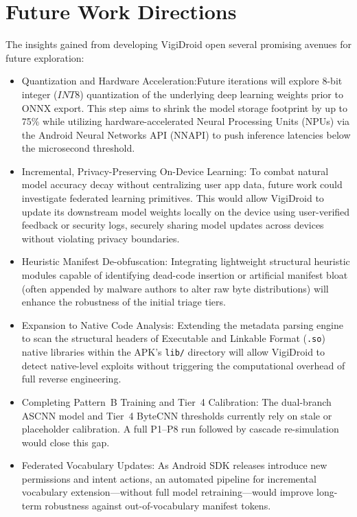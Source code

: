 \section{ Future Work Directions}

The insights gained from developing VigiDroid open several promising avenues for future exploration:
\begin{itemize}


\item Quantization and Hardware Acceleration:Future iterations will explore 8-bit integer ($INT8$) quantization of the underlying deep learning weights prior to ONNX export. This step aims to shrink the model storage footprint by up to 75\% while utilizing hardware-accelerated Neural Processing Units (NPUs) via the Android Neural Networks API (NNAPI) to push inference latencies below the microsecond threshold.
\item Incremental, Privacy-Preserving On-Device Learning: To combat natural model accuracy decay without centralizing user app data, future work could investigate federated learning primitives. This would allow VigiDroid to update its downstream model weights locally on the device using user-verified feedback or security logs, securely sharing model updates across devices without violating privacy boundaries.
\item Heuristic Manifest De-obfuscation: Integrating lightweight structural heuristic modules capable of identifying dead-code insertion or artificial manifest bloat (often appended by malware authors to alter raw byte distributions) will enhance the robustness of the initial triage tiers.
\item Expansion to Native Code Analysis: Extending the metadata parsing engine to scan the structural headers of Executable and Linkable Format (\texttt{.so}) native libraries within the APK's \texttt{lib/} directory will allow VigiDroid to detect native-level exploits without triggering the computational overhead of full reverse engineering.

\item Completing Pattern~B Training and Tier~4 Calibration: The dual-branch ASCNN model and Tier~4 ByteCNN thresholds currently rely on stale or placeholder calibration. A full P1--P8 run followed by cascade re-simulation would close this gap.

\item Federated Vocabulary Updates: As Android SDK releases introduce new permissions and intent actions, an automated pipeline for incremental vocabulary extension---without full model retraining---would improve long-term robustness against out-of-vocabulary manifest tokens.

\end{itemize}

